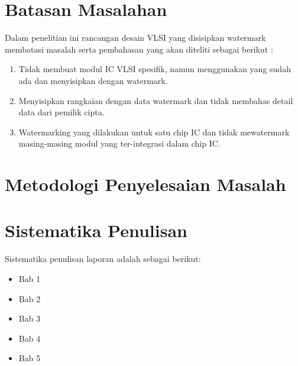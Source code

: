 \section{Batasan Masalahan}
Dalam penelitian ini rancangan desain VLSI yang disisipkan watermark
membatasi masalah serta pembahasan yang akan diteliti sebagai berikut :

\begin{enumerate}
	\item Tidak membuat modul IC VLSI spesifik, namun menggunakan yang
	sudah ada dan menyisipkan dengan watermark.
	
	\item Menyisipkan rangkaian dengan data watermark dan tidak membahas
	detail data dari pemilik cipta.
	
	\item Watermarking yang dilakukan untuk satu chip IC dan tidak mewatermark
	masing-masing modul yang ter-integrasi dalam chip IC. 
\end{enumerate}
\section{Metodologi Penyelesaian Masalah}

\section{Sistematika Penulisan}
Sistematika penulisan laporan adalah sebagai berikut:
\begin{itemize}
	\item Bab 1 \babSatu
	\item Bab 2 \babDua
	\item Bab 3 \babTiga
	\item Bab 4 \babEmpat
	\item Bab 5 \kesimpulan
\end{itemize}